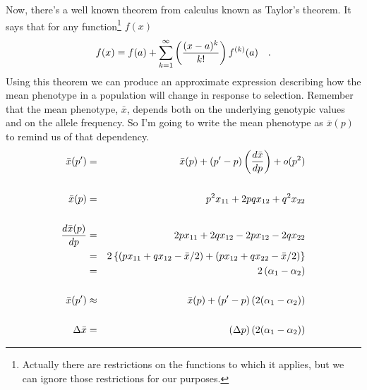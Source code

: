\documentclass[12pt]{article}
\begin{document}
Now, there's a well known theorem from calculus known as Taylor's
theorem. It says that for any function\footnote{Actually there are
  restrictions on the functions to which it applies, but we can ignore
  those restrictions for our purposes.} $f(x)$
\[
f(x) = f(a) + \sum_{k=1}^\infty \left({{(x-a)^k} \over k!}\right)
                                 f^{(k)}(a) \quad .
\]
Using this theorem we can produce an approximate expression describing
how the mean phenotype in a population will change in response to
selection. Remember that the mean phenotype, $\bar x$, depends both on
the underlying genotypic values and on the allele frequency. So I'm
going to write the mean phenotype as $\bar x(p)$ to remind us of that
dependency.
\begin{eqnarray*}
{\bar x}(p') &=& {\bar x}(p) + (p' - p)\left({d{\bar x} \over dp}\right)
             + o(p^2) \\
\\
{\bar x}(p) &=& p^2x_{11} + 2pqx_{12} + q^2x_{22} \\
\\
\frac{d{\bar x(p)}}{dp}
         &=& 2px_{11} + 2qx_{12} - 2px_{12} - 2qx_{22} \\
         &=& 2\left\{
             \left(px_{11} + qx_{12} - {\bar x}/2\right) +
             \left(px_{12} + qx_{22} - {\bar x}/2\right)\right\} \\
         &=& 2\left(\alpha_1 - \alpha_2\right) \\
\\
{\bar x}(p') &\approx& {\bar x}(p) + (p' - p)\left(2(\alpha_1 - \alpha_2)\right) \\
\\
\Delta{\bar x} &=& (\Delta p)\left(2(\alpha_1 - \alpha_2)\right)
\end{eqnarray*}
\end{document}

